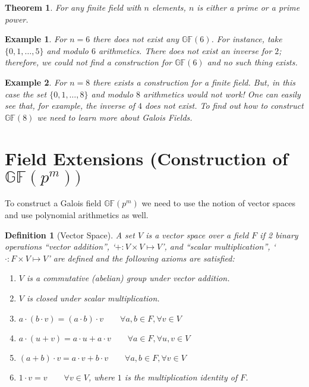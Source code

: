 \documentclass[12pt]{article}
\newtheorem{theorem}{Theorem}
\newtheorem{example}{Example}
\newtheorem{definition}{Definition}
\newcommand{\gf}[1]{\mathds{GF}\left(#1\right)} %
\begin{document}
\begin{theorem}
	For any finite field with $n$ elements, $n$ is either a prime or a prime power.
\end{theorem}

\begin{example}
	For $n=6$ there does not exist any $\gf{6}$. For instance, take $\{0,1,\ldots, 5\}$ and modulo $6$ arithmetics. There does not exist an inverse for $2$; therefore, we could not find a construction for $\gf{6}$ and no such thing exists.
\end{example}

\begin{example}
	For $n=8$ there exists a construction for a finite field. But, in this case the set $\{0,1,\ldots, 8\}$ and modulo $8$ arithmetics would not work! One can easily see that, for example, the inverse of $4$ does not exist. To find out how to construct $\gf{8}$ we need to learn more about Galois Fields. 
\end{example}

\newpage

\section{Field Extensions (Construction of $\gf{p^m})$}



To construct a Galois field $\gf{p^m}$ we need to use the notion of vector spaces and use polynomial arithmetics as well.

\begin{definition}[Vector Space]
	A set $V$ is a vector space over a field $F$ if 2 binary operations ``vector addition'', `$+: V\times V \mapsto V $', and ``scalar multiplication'', `$\cdot: F\times V \mapsto V $' are defined and the following axioms are satisfied:
	\begin{enumerate}
		\item  $V$ is a commutative (abelian) group under vector addition.
		\item  $V$ is closed under scalar multiplication.
		\item  $a\cdot (b\cdot v) = (a\cdot b) \cdot v \qquad \forall a,b\in F , \forall v\in V$
		\item $a\cdot (u + v) = a\cdot u + a\cdot v \qquad \forall a\in F , \forall u,v\in V$
		\item $(a+b)\cdot v = a\cdot v + b\cdot v \qquad \forall a,b\in F , \forall v\in V$
		\item $1\cdot v = v \qquad \forall v\in V$, where $1$ is the multiplication identity of $F$. 
	\end{enumerate}
\end{definition}
\end{document}
